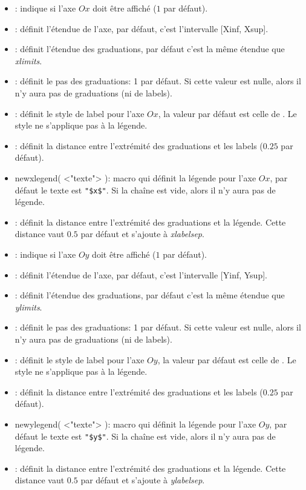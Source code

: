 \begin{itemize}
\begin{itemize}
  \item {}: indique si l'axe $Ox$ doit être affiché ($1$ par défaut).
  \item {}: définit l'étendue de l'axe, par défaut, c'est l'intervalle [Xinf, Xsup].
  \item {}: définit l'étendue des graduations, par défaut c'est la même étendue que \textit{xlimits}.
  \item {}: définit le pas des graduations: 1 par défaut. Si cette valeur est nulle, alors il n'y aura pas de graduations (ni de labels).
  \item {}: définit le style de label pour l'axe $Ox$, la valeur par défaut est celle de . Le style ne s'applique pas à la légende.
  \item {}: définit la distance entre l'extrémité des graduations et les labels ($0.25$ par défaut).
  \item \textcolor{\coloropt}{newxlegend( <"texte"> )}: macro qui définit la légende pour l'axe $Ox$, par défaut le texte est \verb|"$x$"|. Si la chaîne est vide, alors il n'y aura pas de légende.
  \item {}: définit la distance entre l'extrémité des graduations et la légende. Cette distance vaut $0.5$ par défaut et s'ajoute à \textit{xlabelsep}.

  \item {}: indique si l'axe $Oy$ doit être affiché ($1$ par défaut).
  \item {}: définit l'étendue de l'axe, par défaut, c'est l'intervalle [Yinf, Ysup].
  \item {}: définit l'étendue des graduations, par défaut c'est la même étendue que \textit{ylimits}.
  \item {}: définit le pas des graduations: 1 par défaut. Si cette valeur est nulle, alors il n'y aura pas de graduations (ni de labels).
  \item {}: définit le style de label pour l'axe $Oy$, la valeur par défaut est celle de . Le style ne s'applique pas à la légende.
  \item {}: définit la distance entre l'extrémité des graduations et les labels ($0.25$ par défaut).
  \item \textcolor{\coloropt}{newylegend( <"texte"> )}: macro qui définit la légende pour l'axe $Oy$, par défaut le texte est \verb|"$y$"|. Si la chaîne est vide, alors il n'y aura pas de légende.
  \item {}: définit la distance entre l'extrémité des graduations et la légende. Cette distance vaut $0.5$ par défaut et s'ajoute à \textit{ylabelsep}.


\end{itemize}
\end{itemize}
